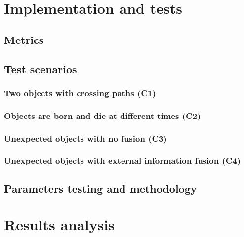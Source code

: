 \documentclass[english,master,unicode]{ctufit-thesis}
\theoremstyle{plain}
\theoremstyle{definition}
\theoremstyle{remark}
\numberwithin{theorem}{chapter}
\begin{document}
\chapter{Implementation and tests}\label{ch:implementation}
    
    \section{Metrics}\label{sec:metrics}
        
    \section{Test scenarios}\label{sec:test-scenarios}
        
        \subsection{Two objects with crossing paths (C1)}\label{sec:c1-scenario}
            
        \subsection{Objects are born and die at different times (C2)}\label{sec:c2-scenario}
            
        \subsection{Unexpected objects with no fusion (C3)}\label{sec:c3-scenario}
            
        \subsection{Unexpected objects with external information fusion (C4)}\label{sec:c4-scenario}
            
    \section{Parameters testing and methodology}\label{sec:parameters-tests}
        

\chapter{Results analysis}\label{ch:results}
    
\end{document}
